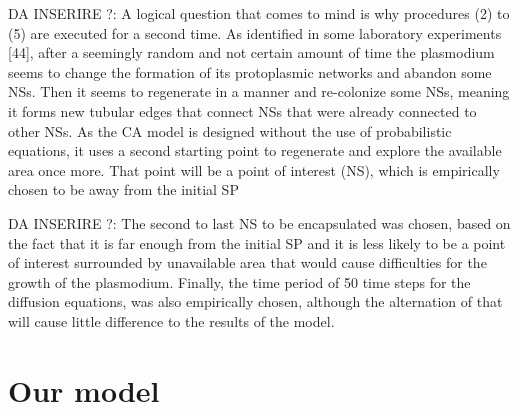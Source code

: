 \par
DA INSERIRE ?: A logical question that comes to mind is why procedures (2) to (5) are executed
for a second time. As identified in some laboratory experiments [44], after a seemingly
random and not certain amount of time the plasmodium seems to change the
formation of its protoplasmic networks and abandon some NSs. Then it seems to
regenerate in a manner and re-colonize some NSs, meaning it forms new tubular
edges that connect NSs that were already connected to other NSs. As the CA model
is designed without the use of probabilistic equations, it uses a second starting point
to regenerate and explore the available area once more. That point will be a point of
interest (NS), which is empirically chosen to be away from the initial SP
\par
DA INSERIRE ?: The second to last NS to
be encapsulated was chosen, based on the fact that it is far enough from the initial
SP and it is less likely to be a point of interest surrounded by unavailable area that
would cause difficulties for the growth of the plasmodium. Finally, the time period
of 50 time steps for the diffusion equations, was also empirically chosen, although
the alternation of that will cause little difference to the results of the model.

\section{Our model}
